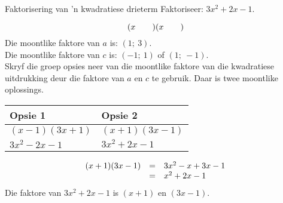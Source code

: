 \begin{wex}{Faktorisering van ’n kwadratiese drieterm}
{Faktoriseer: $3{x}^{2}+2x-1$.} 
{
\begin{equation*}
(x\phantom{\rule{2.em}{0ex}})(x\phantom{\rule{2.em}{0ex}})
\end{equation*}
Die moontlike faktore van $a$ is: $(1;~3)$.\\
Die moontlike faktore van $c$ is: $(-1;~1)$ of $(1;~-1)$.\\
Skryf die groep opsies neer van die moontlike faktore van die kwadratiese uitdrukking deur die faktore van $a$ en $c$ te gebruik.
Daar is twee moontlike oplossings.\par 

\begin{table}[H]

\begin{center}


\begin{tabular}{|l|l|}\hline
\textbf{Opsie 1} &
\textbf{Opsie 2}%
\\ \hline
$(x-1)(3x+1)$
&
$(x+1)(3x-1)$
\\ \hline
$3{x}^{2}-2x-1$
&
\uline{
$3{x}^{2}+2x-1$
}
\\ \hline
\end{tabular}
\end{center}

\end{table}

\begin{equation*}
\begin{array}{ccl}  
(x+1)(3x-1)& =& 3{x}^{2}-x+3x-1\hfill \\ & =& {x}^{2}+2x-1\end{array}
\end{equation*}
Die faktore van $3{x}^{2}+2x-1$ is $(x+1)$ en $(3x-1)$.
}
\end{wex}


